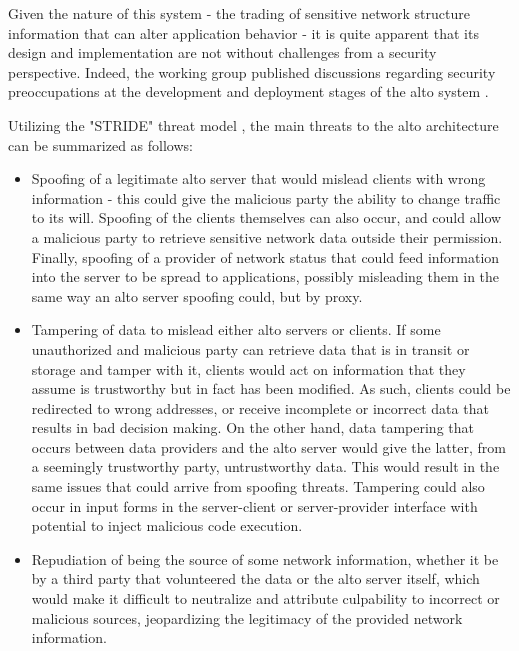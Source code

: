     Given the nature of this system - the trading of sensitive network structure information that can alter application behavior - it is quite apparent that its design and implementation are not without challenges from a security perspective.
    Indeed, the working group published discussions regarding security preoccupations at the development and deployment stages of the \gls{alto} system \cite{alto-problem-statement} \cite{alto-protocol} \cite{alto-deployment-considerations}.

    Utilizing the "STRIDE" threat model \cite{stride}, the main threats to the \gls{alto} architecture can be summarized as follows:

\begin{itemize}
    \item Spoofing of a legitimate \gls{alto} server that would mislead clients with wrong information - this could give the malicious party the ability to change traffic to its will.
        Spoofing of the clients themselves can also occur, and could allow a malicious party to retrieve sensitive network data outside their permission.
        Finally, spoofing of a provider of network status that could feed information into the server to be spread to applications, possibly misleading them in the same way an \gls{alto} server spoofing could, but by proxy.
    \item Tampering of data to mislead either \gls{alto} servers or clients.
        If some unauthorized and malicious party can retrieve data that is in transit or storage and tamper with it, clients would act on information that they assume is trustworthy but in fact has been modified.
        As such, clients could be redirected to wrong addresses, or receive incomplete or incorrect data that results in bad decision making.
        On the other hand, data tampering that occurs between data providers and the \gls{alto} server would give the latter, from a seemingly trustworthy party, untrustworthy data.
        This would result in the same issues that could arrive from spoofing threats.
        Tampering could also occur in input forms in the server-client or server-provider interface with potential to inject malicious code execution.
    \item Repudiation of being the source of some network information, whether it be by a third party that volunteered the data or the \gls{alto} server itself, which would make it difficult to neutralize and attribute culpability to incorrect or malicious sources, jeopardizing the legitimacy of the provided network information.

\end{itemize}

